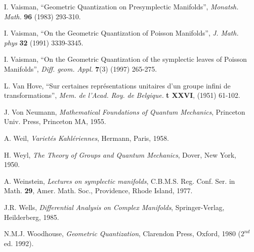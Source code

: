 \documentclass[12pt]{article}
\theoremstyle{plain}
\begin{document}
\begin{thebibliography}{55}
{\sc I. Vaisman},
``Geometric Quantization on Presymplectic Manifolds'',
{\it Monatsh. Math.} {\bf 96} (1983) 293-310.

{\sc I. Vaisman},
``On the Geometric Quantization of Poisson Manifolds'',
{\it J. Math. phys} {\bf 32} (1991) 3339-3345.

{\sc I. Vaisman},
``On the Geometric Quantization of the symplectic leaves of Poisson
Manifolds'',
{\it Diff. geom. Appl.} {\bf 7}(3) (1997) 265-275.

{\sc L. Van Hove},
``Sur certaines repr\'esentations unitaires
  d'un groupe infini de transformations'',
{\it Mem. de l'Acad. Roy. de Belgique.}
{\bf t XXVI}, (1951) 61-102.

{\sc J. Von Neumann},
{\it Mathematical Foundations of Quantum Mechanics},
Princeton Univ. Press, Princeton MA, 1955.

{\sc A. Weil},
{\it Variet\'es Kahl\'eriennes\/},
Hermann, Paris, 1958.

{\sc H. Weyl},
{\it The Theory of Groups and Quantum Mechanics},
Dover, New York, 1950.

{\sc A. Weinstein},
{\it Lectures on symplectic manifolds\/},
C.B.M.S. Reg. Conf. Ser. in Math. {\bf 29},
Amer. Math. Soc., Providence, Rhode Island, 1977.

{\sc J.R. Wells},
{\it Differential Analysis on Complex Manifolds},
Springer-Verlag, Heilderberg, 1985.

{\sc N.M.J. Woodhouse},
{\it Geometric Quantization\/}, Clarendon Press, Oxford, 1980 ($2^{nd}$
ed. 1992).

\end{thebibliography}
\end{document}
